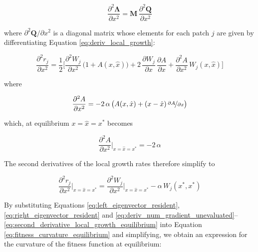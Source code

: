 \begin{equation}
    \frac{\partial^2 \pmb{\Lambda}}{\partial x^2} = \pmb{M} \, \frac{\partial^2 \pmb{Q}}{\partial x^2}
    \label{eq:second_derivative_transition}
\end{equation}

where $\partial^2 \pmb{Q} / \partial x^2$ is a diagonal matrix whose elements for each patch $j$ are given by differentiating Equation \ref{eq:deriv_local_growth}:

\begin{equation}
    \frac{\partial^2 r_j}{\partial x^2} = \frac{1}{2} \bigg[\frac{\partial^2 W_j}{\partial x^2}\,\big(1+A(x,\hat{x})\big) + 2\,\frac{\partial W_j}{\partial x}\,\frac{\partial A}{\partial x} + \frac{\partial^2 A}{\partial x^2}\,W_j(x,\hat{x})\bigg]
\end{equation}

where

\begin{equation}
    \frac{\partial^2 A}{\partial x^2} = -2\,\alpha\,\big( A(x,\hat{x}) + (x-\hat{x})\,\nicefrac{\partial A}{\partial x} \big)
\end{equation}

which, at equilibrium $x=\hat{x}=x^*$ becomes

\begin{equation}
    \frac{\partial^2 A}{\partial x^2}\bigg|_{x=\hat{x}=x^*} = -2\,\alpha
\end{equation}

The second derivatives of the local growth rates therefore simplify to

\begin{equation}
    \frac{\partial^2 r_j}{\partial x^2}\bigg|_{x=\hat{x}=x^*}= \frac{\partial^2 W_j}{\partial x^2}\bigg|_{x=\hat{x}=x^*} - \alpha \, W_j(x^*,x^*)
    \label{eq:second_derivative_local_growth_equilibrium}
\end{equation}

By substituting Equations \ref{eq:left_eigenvector_resident}, \ref{eq:right_eigenvector_resident} and \ref{eq:deriv_num_gradient_unevaluated}--\ref{eq:second_derivative_local_growth_equilibrium} into Equation \ref{eq:fitness_curvature_equilibrium} and simplifying, we obtain an expression for the curvature of the fitness function at equilibrium:

